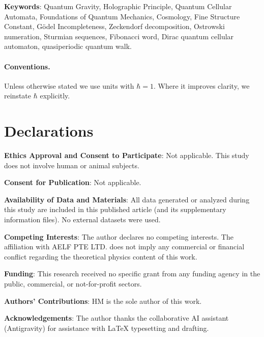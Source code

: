 \documentclass[11pt,a4paper]{article}
\begin{document}
\textbf{Keywords}: Quantum Gravity, Holographic Principle, Quantum Cellular Automata, Foundations of Quantum Mechanics, Cosmology, Fine Structure Constant, Gödel Incompleteness, Zeckendorf decomposition, Ostrowski numeration, Sturmian sequences, Fibonacci word, Dirac quantum cellular automaton, quasiperiodic quantum walk.

\paragraph{Conventions.}
Unless otherwise stated we use units with $\hbar=1$. Where it improves clarity, we reinstate $\hbar$ explicitly.

\tableofcontents
\newpage











\section*{Declarations}

\textbf{Ethics Approval and Consent to Participate}: Not applicable. This study does not involve human or animal subjects.

\textbf{Consent for Publication}: Not applicable.

\textbf{Availability of Data and Materials}: All data generated or analyzed during this study are included in this published article (and its supplementary information files). No external datasets were used.

\textbf{Competing Interests}: The author declares no competing interests. The affiliation with AELF PTE LTD. does not imply any commercial or financial conflict regarding the theoretical physics content of this work.

\textbf{Funding}: This research received no specific grant from any funding agency in the public, commercial, or not-for-profit sectors.

\textbf{Authors' Contributions}: HM is the sole author of this work.

\textbf{Acknowledgements}: The author thanks the collaborative AI assistant (Antigravity) for assistance with LaTeX typesetting and drafting.



\end{document}
